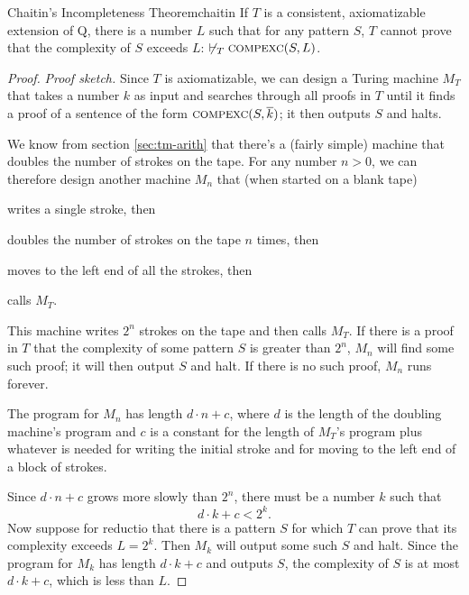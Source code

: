 \begin{theorem}{Chaitin's Incompleteness Theorem}{chaitin}
  If $T$ is a consistent, axiomatizable extension of Q,
  there is a number $L$ such that
  for any pattern $S$,
  $T$ cannot prove that the complexity of $S$ exceeds $L$:
  $\not\proves_T \smallcaps{CompExc}(S, L)$.
\end{theorem}
\begin{proof}
  \emph{Proof sketch.}
  Since $T$ is axiomatizable,
  we can design a Turing machine $M_T$ that
  takes a number $k$ as input and
  searches through all proofs in $T$
  until it finds a proof of a sentence of the form $\smallcaps{CompExc}(S, \num{k})$;
  it then outputs $S$ and halts.
  
  We know from section \ref{sec:tm-arith}
  that there's a (fairly simple) machine that doubles the number of strokes on the tape.
  For any number $n>0$,
  we can therefore design another machine $M_n$ that (when started on a blank tape)
  \begin{cenumerate}
    \item[1.] writes a single stroke, then
    \item[2.] doubles the number of strokes on the tape $n$ times, then
    \item[3.] moves to the left end of all the strokes, then
    \item[4.] calls $M_T$.
  \end{cenumerate}
  This machine writes $2^n$ strokes on the tape and then calls $M_T$.
  If there is a proof in $T$
  that the complexity of some pattern $S$ is greater than $2^n$,
  $M_n$ will find some such proof;
  it will then output $S$ and halt.
  If there is no such proof,
  $M_n$ runs forever.

  The program for $M_n$ has length $d \cdot n + c$,
  where $d$ is the length of the doubling machine's program
  and $c$ is a constant for 
  the length of $M_T$'s program
  plus whatever is needed for writing the initial stroke and
  for moving to the left end of a block of strokes.

  Since $d \cdot n + c$ grows more slowly than $2^n$,
  there must be a number $k$ such that
  \[
    d \cdot k + c < 2^k.
  \]
  Now suppose for reductio that there is a pattern $S$
  for which $T$ can prove that its complexity exceeds $L = 2^k$.
  Then $M_k$ will output some such $S$ and halt.
  Since the program for $M_k$ has length $d \cdot k + c$ and outputs $S$,
  the complexity of $S$ is at most $d \cdot k + c$,
  which is less than $L$.
  

\end{proof}
